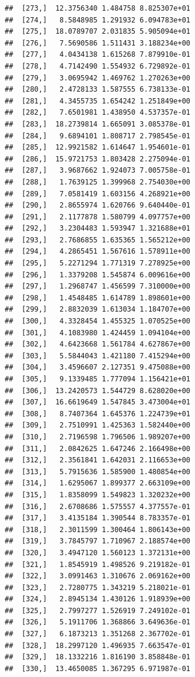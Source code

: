 \documentclass[article]{jss}\usepackage[]{graphicx}\usepackage[]{xcolor}
\makeatletter
\newenvironment{kframe}{%
 \def\at@end@of@kframe{}%
 \ifinner\ifhmode%
  \def\at@end@of@kframe{\end{minipage}}%
  \begin{minipage}{\columnwidth}%
 \fi\fi%
 \def\FrameCommand##1{\hskip\@totalleftmargin \hskip-\fboxsep
 \colorbox{shadecolor}{##1}\hskip-\fboxsep
     \hskip-\linewidth \hskip-\@totalleftmargin \hskip\columnwidth}%
 \MakeFramed {\advance\hsize-\width
   \@totalleftmargin\z@ \linewidth\hsize
   \@setminipage}}%
 {\par\unskip\endMakeFramed%
 \at@end@of@kframe}
\newenvironment{knitrout}{}{} %
\makeatother
\begin{document}
\begin{knitrout}
\begin{kframe}
\begin{verbatim}
##  [273,]  12.3756340 1.484758 8.825307e+01
##  [274,]   8.5848985 1.291932 6.094783e+01
##  [275,]  18.0789707 2.031835 5.905094e+01
##  [276,]   7.5690586 1.511431 3.188234e+00
##  [277,]   4.0434138 1.615268 7.879910e-01
##  [278,]   4.7142490 1.554932 6.729892e-01
##  [279,]   3.0695942 1.469762 1.270263e+00
##  [280,]   2.4728133 1.587555 6.738133e-01
##  [281,]   4.3455735 1.654242 1.251849e+00
##  [282,]   7.6501981 1.438950 4.537357e-01
##  [283,]  18.2739814 1.665091 3.085378e-01
##  [284,]   9.6894101 1.808717 2.798545e-01
##  [285,]  12.9921582 1.614647 1.954601e-01
##  [286,]  15.9721753 1.803428 2.275094e-01
##  [287,]   3.9687662 1.924073 7.005758e-01
##  [288,]   1.7639125 1.399968 2.754030e+00
##  [289,]   7.0581419 1.603156 4.268921e+00
##  [290,]   2.8655974 1.620766 9.640440e-01
##  [291,]   2.1177878 1.580799 4.097757e+00
##  [292,]   3.2304483 1.593947 1.321688e+01
##  [293,]   2.7686855 1.635365 1.565212e+00
##  [294,]   4.2865451 1.567616 1.578911e+00
##  [295,]   5.2271294 1.771319 7.278925e+00
##  [296,]   1.3379208 1.545874 6.009616e+00
##  [297,]   1.2968747 1.456599 7.310000e+00
##  [298,]   1.4548485 1.614789 1.898601e+00
##  [299,]   2.8832039 1.613034 1.184707e+00
##  [300,]   4.3328454 1.455325 1.070525e+00
##  [301,]   4.1083980 1.424459 1.094104e+00
##  [302,]   4.6423668 1.561784 4.627867e+00
##  [303,]   5.5844043 1.421180 7.415294e+00
##  [304,]   3.4596607 2.127351 9.475088e+00
##  [305,]   9.1339485 1.777094 1.156421e+01
##  [306,]  13.2420573 1.544729 8.628020e+00
##  [307,]  16.6619649 1.547845 3.473004e+01
##  [308,]   8.7407364 1.645376 1.224739e+01
##  [309,]   2.7510991 1.425363 1.582440e+00
##  [310,]   2.7196598 1.796506 1.989207e+00
##  [311,]   2.0842625 1.647246 2.166498e+00
##  [312,]   2.3561841 1.642031 2.116653e+00
##  [313,]   5.7915636 1.585900 1.480854e+00
##  [314,]   1.6295067 1.899377 2.663109e+00
##  [315,]   1.8358099 1.549823 1.320232e+00
##  [316,]   2.6708686 1.575557 4.377557e-01
##  [317,]   3.4135184 1.390544 8.783357e-01
##  [318,]   2.3011599 1.300464 1.806143e+00
##  [319,]   3.7845797 1.710967 2.188574e+00
##  [320,]   3.4947120 1.560123 1.372131e+00
##  [321,]   1.8545919 1.498526 9.219182e-01
##  [322,]   3.0991463 1.310676 2.069162e+00
##  [323,]   2.7280775 1.343219 5.218021e-01
##  [324,]   2.8945134 1.430126 1.918939e+00
##  [325,]   2.7997277 1.526919 7.249102e-01
##  [326,]   5.1911706 1.368866 3.649636e-01
##  [327,]   6.1873213 1.351268 2.367702e-01
##  [328,]  18.2997120 1.496935 7.663547e-01
##  [329,]  18.1332216 1.816190 3.858848e-01
##  [330,]  13.4650085 1.367295 6.971987e-01

\end{verbatim}
\end{kframe}
\end{knitrout}
\end{document}
